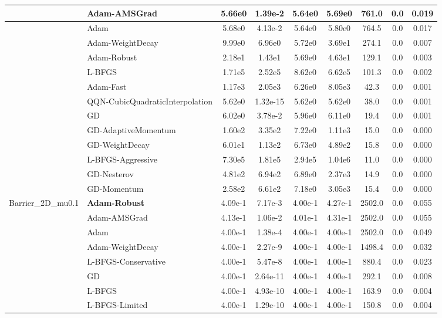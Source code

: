 \documentclass[10pt]{article}
\begin{document}
\begin{longtable}{|l|l|c|c|c|c|c|c|c|}
\hline
 & Adam-AMSGrad & 5.66e0 & 1.39e-2 & 5.64e0 & 5.69e0 & 761.0 & 0.0 & 0.019 \\
\hline
 & Adam & 5.68e0 & 4.13e-2 & 5.64e0 & 5.80e0 & 764.5 & 0.0 & 0.017 \\
\hline
 & Adam-WeightDecay & 9.99e0 & 6.96e0 & 5.72e0 & 3.69e1 & 274.1 & 0.0 & 0.007 \\
\hline
 & Adam-Robust & 2.18e1 & 1.43e1 & 5.69e0 & 4.63e1 & 129.1 & 0.0 & 0.003 \\
\hline
 & L-BFGS & 1.71e5 & 2.52e5 & 8.62e0 & 6.62e5 & 101.3 & 0.0 & 0.002 \\
\hline
 & Adam-Fast & 1.17e3 & 2.05e3 & 6.26e0 & 8.05e3 & 42.3 & 0.0 & 0.001 \\
\hline
 & QQN-CubicQuadraticInterpolation & 5.62e0 & 1.32e-15 & 5.62e0 & 5.62e0 & 38.0 & 0.0 & 0.001 \\
\hline
 & GD & 6.02e0 & 3.78e-2 & 5.96e0 & 6.11e0 & 19.4 & 0.0 & 0.001 \\
\hline
 & GD-AdaptiveMomentum & 1.60e2 & 3.35e2 & 7.22e0 & 1.11e3 & 15.0 & 0.0 & 0.000 \\
\hline
 & GD-WeightDecay & 6.01e1 & 1.13e2 & 6.73e0 & 4.89e2 & 15.8 & 0.0 & 0.000 \\
\hline
 & L-BFGS-Aggressive & 7.30e5 & 1.81e5 & 2.94e5 & 1.04e6 & 11.0 & 0.0 & 0.000 \\
\hline
 & GD-Nesterov & 4.81e2 & 6.94e2 & 6.89e0 & 2.37e3 & 14.9 & 0.0 & 0.000 \\
\hline
 & GD-Momentum & 2.58e2 & 6.61e2 & 7.18e0 & 3.05e3 & 15.4 & 0.0 & 0.000 \\
Barrier\_2D\_mu0.1 & \textbf{Adam-Robust} & 4.09e-1 & 7.17e-3 & 4.00e-1 & 4.27e-1 & 2502.0 & 0.0 & 0.055 \\
\hline
 & Adam-AMSGrad & 4.13e-1 & 1.06e-2 & 4.01e-1 & 4.31e-1 & 2502.0 & 0.0 & 0.055 \\
\hline
 & Adam & 4.00e-1 & 1.38e-4 & 4.00e-1 & 4.00e-1 & 2502.0 & 0.0 & 0.049 \\
\hline
 & Adam-WeightDecay & 4.00e-1 & 2.27e-9 & 4.00e-1 & 4.00e-1 & 1498.4 & 0.0 & 0.032 \\
\hline
 & L-BFGS-Conservative & 4.00e-1 & 5.47e-8 & 4.00e-1 & 4.00e-1 & 880.4 & 0.0 & 0.023 \\
\hline
 & GD & 4.00e-1 & 2.64e-11 & 4.00e-1 & 4.00e-1 & 292.1 & 0.0 & 0.008 \\
\hline
 & L-BFGS & 4.00e-1 & 4.93e-10 & 4.00e-1 & 4.00e-1 & 163.9 & 0.0 & 0.004 \\
\hline
 & L-BFGS-Limited & 4.00e-1 & 1.29e-10 & 4.00e-1 & 4.00e-1 & 150.8 & 0.0 & 0.004 \\

\end{longtable}
\end{document}
